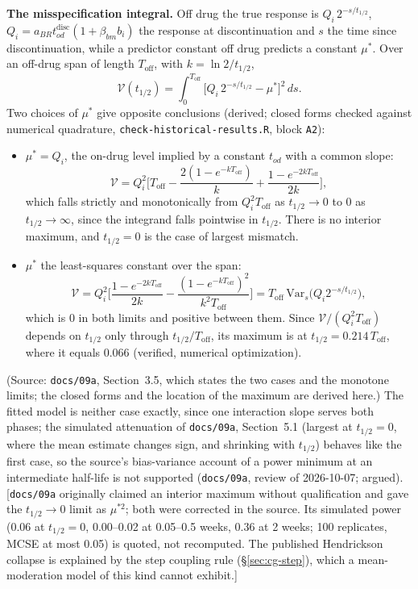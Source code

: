 \documentclass[11pt]{article}
\newcommand{\note}[1]{\textcolor{blue!60!black}{\small [#1]}}
\newcommand{\code}[1]{\texttt{#1}}
\begin{document}
\textbf{The misspecification integral.} Off drug the true response is
$Q_i\,2^{-s/t_{1/2}}$, $Q_i = a_{BR}t_{od}^{\mathrm{disc}}(1 +
\beta_{bm}b_i)$ the response at discontinuation and $s$ the time since
discontinuation, while a predictor constant off drug predicts a
constant $\mu^\ast$. Over an off-drug span of length $T_{\mathrm{off}}$,
with $k = \ln 2/t_{1/2}$,
\begin{equation}
\mathcal V(t_{1/2}) = \int_0^{T_{\mathrm{off}}}
  \big[Q_i\,2^{-s/t_{1/2}} - \mu^\ast\big]^2\,ds .
\label{eq:inva-V}
\end{equation}
Two choices of $\mu^\ast$ give opposite conclusions (derived; closed
forms checked against numerical quadrature, \code{check-historical-results.R},
block \code{A2}):
\begin{itemize}[itemsep=2pt]
\item $\mu^\ast = Q_i$, the on-drug level implied by a constant
  $t_{od}$ with a common slope:
  \begin{equation}
  \mathcal V = Q_i^2\Big[T_{\mathrm{off}} - \frac{2(1 - e^{-kT_{\mathrm{off}}})}{k}
    + \frac{1 - e^{-2kT_{\mathrm{off}}}}{2k}\Big],
  \label{eq:inva-V-fixed}
  \end{equation}
  which falls strictly and monotonically from $Q_i^2T_{\mathrm{off}}$
  as $t_{1/2}\to0$ to 0 as $t_{1/2}\to\infty$, since the integrand
  falls pointwise in $t_{1/2}$. There is no interior maximum, and
  $t_{1/2} = 0$ is the case of largest mismatch.
\item $\mu^\ast$ the least-squares constant over the span:
  \begin{equation}
  \mathcal V = Q_i^2\Big[\frac{1 - e^{-2kT_{\mathrm{off}}}}{2k}
    - \frac{(1 - e^{-kT_{\mathrm{off}}})^2}{k^2T_{\mathrm{off}}}\Big]
    = T_{\mathrm{off}}\,\mathrm{Var}_s\big(Q_i 2^{-s/t_{1/2}}\big),
  \label{eq:inva-V-ls}
  \end{equation}
  which is 0 in both limits and positive between them. Since
  $\mathcal V/(Q_i^2T_{\mathrm{off}})$ depends on $t_{1/2}$ only through
  $t_{1/2}/T_{\mathrm{off}}$, its maximum is at
  $t_{1/2} = 0.214\,T_{\mathrm{off}}$, where it equals 0.066 (verified,
  numerical optimization).
\end{itemize}
(Source: \code{docs/09a}, Section~3.5, which states the two cases and
the monotone limits; the closed forms and the location of the maximum
are derived here.) The fitted model is neither case exactly, since one
interaction slope serves both phases; the simulated attenuation of
\code{docs/09a}, Section~5.1 (largest at $t_{1/2} = 0$, where the mean
estimate changes sign, and shrinking with $t_{1/2}$) behaves like the
first case, so the source's bias-variance account of a power minimum
at an intermediate half-life is not supported (\code{docs/09a}, review
of 2026-10-07; argued). \note{\code{docs/09a} originally claimed an
interior maximum without qualification and gave the $t_{1/2}\to0$ limit
as $\mu^{\ast2}$; both were corrected in the source. Its simulated
power (0.06 at $t_{1/2} = 0$, 0.00--0.02 at 0.05--0.5 weeks, 0.36 at
2 weeks; 100 replicates, MCSE at most 0.05) is quoted, not recomputed.
The published Hendrickson collapse is explained by the step coupling
rule (\S\ref{sec:cg-step}), which a mean-moderation model of this kind
cannot exhibit.}
\end{document}
